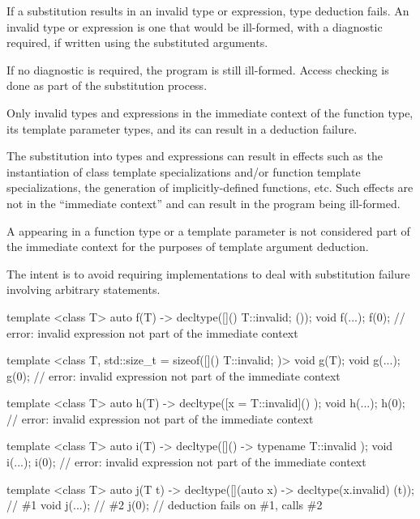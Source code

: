 \pnum
If a substitution results in an invalid type or expression, type deduction fails. An
invalid type or expression is one that would be ill-formed, with a diagnostic
required, if written using the substituted arguments.
\begin{note}
If no
diagnostic is required, the program is still ill-formed. Access checking is done
as part of the substitution
process.
\end{note}
Only invalid types and expressions in the immediate context of
the function type,
its template parameter types,
and its 
can result in a deduction failure.
\begin{note}
The substitution into types and expressions can result
in effects such as the instantiation of class template specializations and/or
function template specializations, the generation of implicitly-defined functions,
etc. Such effects are not in the ``immediate context'' and can result in the
program being ill-formed.
\end{note}

\pnum
A  appearing in a function type
or a template parameter is not considered part of the immediate context
for the purposes of template argument deduction.
\begin{note}
The intent is to avoid requiring implementations to deal with
substitution failure involving arbitrary statements.
\begin{example}
\begin{codeblock}
template <class T>
  auto f(T) -> decltype([]() { T::invalid; } ());
void f(...);
f(0);               // error: invalid expression not part of the immediate context

template <class T, std::size_t = sizeof([]() { T::invalid; })>
  void g(T);
void g(...);
g(0);               // error: invalid expression not part of the immediate context

template <class T>
  auto h(T) -> decltype([x = T::invalid]() { });
void h(...);
h(0);               // error: invalid expression not part of the immediate context

template <class T>
  auto i(T) -> decltype([]() -> typename T::invalid { });
void i(...);
i(0);               // error: invalid expression not part of the immediate context

template <class T>
  auto j(T t) -> decltype([](auto x) -> decltype(x.invalid) { } (t));   // \#1
void j(...);                                                            // \#2
j(0);               // deduction fails on \#1, calls \#2
\end{codeblock}
\end{example}
\end{note}

